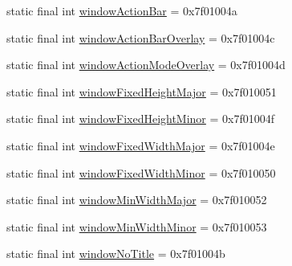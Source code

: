 \begin{CompactItemize}
\item 
static final int \hyperlink{classandroid_1_1support_1_1graphics_1_1drawable_1_1animated_1_1_r_1_1attr_1dec89d4fe18ec758d96a11b04b025be}{windowActionBar} = 0x7f01004a
\item 
static final int \hyperlink{classandroid_1_1support_1_1graphics_1_1drawable_1_1animated_1_1_r_1_1attr_edbe6baa59a11adc0e8e00e88df3db0b}{windowActionBarOverlay} = 0x7f01004c
\item 
static final int \hyperlink{classandroid_1_1support_1_1graphics_1_1drawable_1_1animated_1_1_r_1_1attr_fce1ea0279fc021f94bec66f13ccdba3}{windowActionModeOverlay} = 0x7f01004d
\item 
static final int \hyperlink{classandroid_1_1support_1_1graphics_1_1drawable_1_1animated_1_1_r_1_1attr_5c6d70e097a807b631e0abe3fd062c89}{windowFixedHeightMajor} = 0x7f010051
\item 
static final int \hyperlink{classandroid_1_1support_1_1graphics_1_1drawable_1_1animated_1_1_r_1_1attr_daee97ad6a52fc5f8e4e937917168199}{windowFixedHeightMinor} = 0x7f01004f
\item 
static final int \hyperlink{classandroid_1_1support_1_1graphics_1_1drawable_1_1animated_1_1_r_1_1attr_782124100b9fa0c11d960f34a9cdf723}{windowFixedWidthMajor} = 0x7f01004e
\item 
static final int \hyperlink{classandroid_1_1support_1_1graphics_1_1drawable_1_1animated_1_1_r_1_1attr_d06740d6c319f7c10ca13a909cad4be5}{windowFixedWidthMinor} = 0x7f010050
\item 
static final int \hyperlink{classandroid_1_1support_1_1graphics_1_1drawable_1_1animated_1_1_r_1_1attr_ae34e65e0bba26bfd5320612e50a3976}{windowMinWidthMajor} = 0x7f010052
\item 
static final int \hyperlink{classandroid_1_1support_1_1graphics_1_1drawable_1_1animated_1_1_r_1_1attr_4abf1c6c67ae2c0291ee4137464d98fd}{windowMinWidthMinor} = 0x7f010053
\item 
static final int \hyperlink{classandroid_1_1support_1_1graphics_1_1drawable_1_1animated_1_1_r_1_1attr_5c2b9d40f8c38e1db240d20726c18a61}{windowNoTitle} = 0x7f01004b
\end{CompactItemize}


